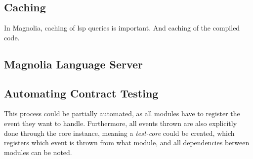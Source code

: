
\subsection{Caching}
In Magnolia, caching of \gls{lsp} queries is important. And caching of the
compiled code.

\subsection{Magnolia Language Server}


\subsection{Automating Contract Testing}

This process could be partially automated, as all modules have to register the
event they want to handle. Furthermore, all events thrown are also explicitly
done through the core instance, meaning a \textit{test-core} could be created,
which registers which event is thrown from what module, and all dependencies
between modules can be noted.

